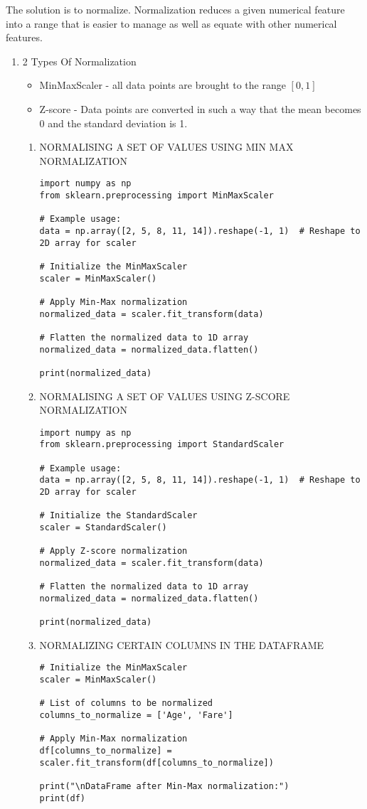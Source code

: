 \documentclass[11pt]{article}
\begin{document}
The solution is to normalize. Normalization reduces a given numerical feature into a range that is easier to manage as well as equate with other numerical features.
\begin{enumerate}
\item 2 Types Of Normalization
\label{sec:org379bd2f}
\begin{itemize}
\item MinMaxScaler - all data points are brought to the range \([0,1]\)
\item Z-score - Data points are converted in such a way that the mean becomes 0 and the standard deviation is 1.
\end{itemize}
\begin{enumerate}
\item NORMALISING A SET OF VALUES USING MIN MAX NORMALIZATION
\label{sec:orgdfd9116}
\begin{verbatim}
import numpy as np
from sklearn.preprocessing import MinMaxScaler

# Example usage:
data = np.array([2, 5, 8, 11, 14]).reshape(-1, 1)  # Reshape to 2D array for scaler

# Initialize the MinMaxScaler
scaler = MinMaxScaler()

# Apply Min-Max normalization
normalized_data = scaler.fit_transform(data)

# Flatten the normalized data to 1D array
normalized_data = normalized_data.flatten()

print(normalized_data)
\end{verbatim}
\item NORMALISING A SET OF VALUES USING Z-SCORE NORMALIZATION
\label{sec:org21ead2d}
\begin{verbatim}
import numpy as np
from sklearn.preprocessing import StandardScaler

# Example usage:
data = np.array([2, 5, 8, 11, 14]).reshape(-1, 1)  # Reshape to 2D array for scaler

# Initialize the StandardScaler
scaler = StandardScaler()

# Apply Z-score normalization
normalized_data = scaler.fit_transform(data)

# Flatten the normalized data to 1D array
normalized_data = normalized_data.flatten()

print(normalized_data)
\end{verbatim}
\item NORMALIZING CERTAIN COLUMNS IN THE DATAFRAME
\label{sec:orgdb3291e}
\begin{verbatim}
# Initialize the MinMaxScaler
scaler = MinMaxScaler()

# List of columns to be normalized
columns_to_normalize = ['Age', 'Fare']

# Apply Min-Max normalization
df[columns_to_normalize] = scaler.fit_transform(df[columns_to_normalize])

print("\nDataFrame after Min-Max normalization:")
print(df)
\end{verbatim}
\end{enumerate}
\end{enumerate}
\end{document}
